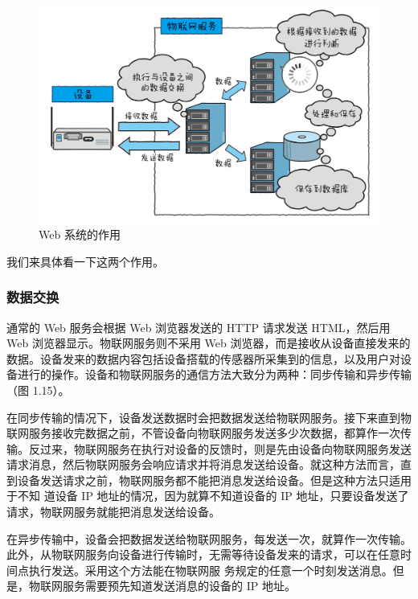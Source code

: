 \documentclass[12pt,UTF8]{ctexbook}
\begin{document}
\begin{figure}[htbp]
	\centering
	\includegraphics[width=1\linewidth]{14}
	\caption{Web 系统的作用}
	\label{fig:1}
\end{figure}

我们来具体看一下这两个作用。

\subsubsection{数据交换}

通常的 Web 服务会根据 Web 浏览器发送的 HTTP 请求发送 HTML，然后用 Web 浏览器显示。物联网服务则不采用 Web 浏览器，而是接收从设备直接发来的数据。设备发来的数据内容包括设备搭载的传感器所采集到的信息，以及用户对设备进行的操作。设备和物联网服务的通信方法大致分为两种：同步传输和异步传输（图 1.15）。

在同步传输的情况下，设备发送数据时会把数据发送给物联网服务。接下来直到物联网服务接收完数据之前，不管设备向物联网服务发送多少次数据，都算作一次传输。反过来，物联网服务在执行对设备的反馈时，则是先由设备向物联网服务发送请求消息，然后物联网服务会响应请求并将消息发送给设备。就这种方法而言，直到设备发送请求之前，物联网服务都不能把消息发送给设备。但是这种方法只适用于不知
道设备 IP 地址的情况，因为就算不知道设备的 IP 地址，只要设备发送了请求，物联网服务就能把消息发送给设备。

在异步传输中，设备会把数据发送给物联网服务，每发送一次，就算作一次传输。此外，从物联网服务向设备进行传输时，无需等待设备发来的请求，可以在任意时间点执行发送。采用这个方法能在物联网服
务规定的任意一个时刻发送消息。但是，物联网服务需要预先知道发送消息的设备的 IP 地址。
\end{document}
